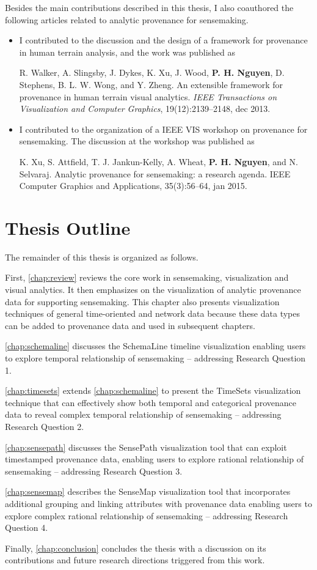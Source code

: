 Besides the main contributions described in this thesis, I also coauthored the following articles related to analytic provenance for sensemaking.

\begin{itemize}
	\item I contributed to the discussion and the design of a framework for provenance in human terrain analysis, and the work was published as
	
	\qquad R. Walker, A. Slingsby, J. Dykes, K. Xu, J. Wood, \textbf{P. H. Nguyen}, D. Stephens, B. L. W. Wong, and Y. Zheng. An extensible framework for provenance in human terrain visual analytics. \textit{IEEE Transactions on Visualization and Computer Graphics}, 19(12):2139--2148, dec 2013.
	
	\item I contributed to the organization of a IEEE VIS workshop on provenance for sensemaking. The discussion at the workshop was published as
	
	\qquad K. Xu, S. Attfield, T. J. Jankun-Kelly, A. Wheat, \textbf{P. H. Nguyen}, and N. Selvaraj. Analytic provenance for sensemaking: a research agenda. IEEE Computer Graphics and Applications, 35(3):56--64, jan 2015.	
\end{itemize}

\section{Thesis Outline} 
The remainder of this thesis is organized as follows.

First, \autoref{chap:review} reviews the core work in sensemaking, visualization and visual analytics. It then emphasizes on the visualization of analytic provenance data for supporting sensemaking. This chapter also presents visualization techniques of general time-oriented and network data because these data types can be added to provenance data and used in subsequent chapters.

\autoref{chap:schemaline} discusses the SchemaLine timeline visualization enabling users to explore temporal relationship of sensemaking -- addressing Research Question 1.

\autoref{chap:timesets} extends \autoref{chap:schemaline} to present the TimeSets visualization technique that can effectively show both temporal and categorical provenance data to reveal complex temporal relationship of sensemaking -- addressing Research Question 2.

\autoref{chap:sensepath} discusses the SensePath visualization tool that can exploit timestamped provenance data, enabling users to explore rational relationship of sensemaking -- addressing Research Question 3.

\autoref{chap:sensemap} describes the SenseMap visualization tool that incorporates additional grouping and linking attributes with provenance data enabling users to explore complex rational relationship of sensemaking -- addressing Research Question 4.

Finally, \autoref{chap:conclusion} concludes the thesis with a discussion on its contributions and future research directions triggered from this work.